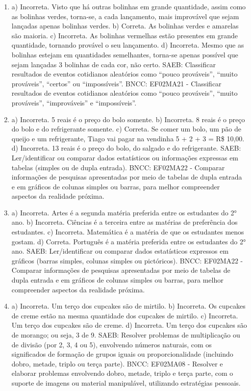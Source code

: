 \begin{enumerate}
\item
a) Incorreta. Visto que há outras bolinhas em grande quantidade, assim
como as bolinhas verdes, torna-se, a cada lançamento, mais improvável
que sejam lançadas apenas bolinhas verdes.
b) Correta. As bolinhas verdes e amarelas são maioria.
c) Incorreta. As bolinhas vermelhas estão presentes em grande
quantidade, tornando provável o seu lançamento.
d) Incorreta. Mesmo que as bolinhas estejam em quantidades semelhantes,
torna-se apenas possível que sejam lançadas 3 bolinhas de cada cor, não certo.
SAEB: Classificar resultados de eventos cotidianos aleatórios
como ``pouco prováveis'', ``muito prováveis'', ``certos'' ou
``impossíveis''.
BNCC: EF02MA21 - Classificar resultados de eventos cotidianos aleatórios
como ``pouco prováveis'', ``muito prováveis'', ``improváveis'' e
``impossíveis''.

\item
a) Incorreta. 5 reais é o preço do bolo somente.
b) Incorreta. 8 reais é o preço do bolo e do refrigerante somente.
c) Correta. Se comer um bolo, um pão de queijo e um refrigerante, Tiago
vai pagar na vendinha 5 + 2 + 3 = R\$ 10,00.
d) Incorreta. 13 reais é o preço do bolo, do salgado e do refrigerante.
SAEB: Ler/identificar ou comparar dados estatísticos ou
informações expressas em tabelas (simples ou de dupla entrada).
BNCC: EF02MA22 - Comparar informações de pesquisas apresentadas por meio
de tabelas de dupla entrada e em gráficos de colunas simples ou barras,
para melhor compreender aspectos da realidade próxima.

\item
a) Incorreta. Artes é a segunda matéria preferida entre os estudantes do 2° ano.
b) Incorreta. Ciências é a terceira entre as matérias de preferência dos estudantes.
c) Incorreta. Matemática é a matéria de que os estudantes menos gostam.
d) Correta. Português é a matéria preferida entre os estudantes do 2° ano.
SAEB: Ler/identificar ou comparar dados estatísticos expressos
em gráficos (barras simples, colunas simples ou pictóricos).
BNCC: EF02MA22 - Comparar informações de pesquisas apresentadas por meio
de tabelas de dupla entrada e em gráficos de colunas simples ou barras,
para melhor compreender aspectos da realidade próxima.

\item
a) Incorreta. Um terço dos cupcakes são de mirtilo.
b) Incorreta. Os cupcakes de creme estão na mesma quantidade dos cupcakes de mirtilo.
c) Incorreta. Um terço dos cupcakes são de creme.
d) Incorreta. Um terço dos cupcakes são de morango; ou seja, 3 de 9.
SAEB: Resolver problemas de multiplicação ou de divisão (por 2,
3, 4 ou 5), envolvendo números naturais, com os significados de formação
de grupos iguais ou proporcionalidade (incluindo dobro, metade, triplo
ou terça parte).
BNCC: EF02MA08 - Resolver e elaborar
problemas envolvendo dobro, metade, triplo e terça parte, com o suporte
de imagens ou material manipulável, utilizando estratégias pessoais.


\end{enumerate}
